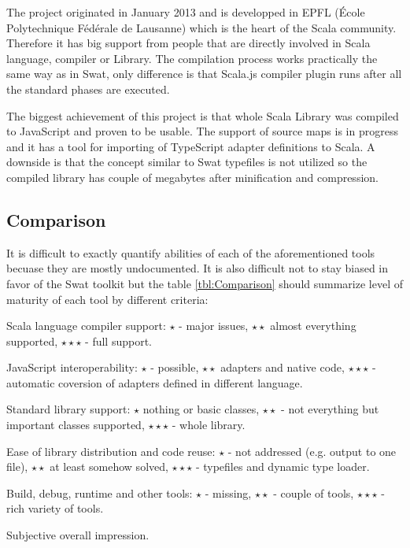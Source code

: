 \documentclass[12pt,a4paper]{report}
\begin{document}
The project originated in January 2013 and is developped in EPFL (École Polytechnique Fédérale de Lausanne) which is the heart of the Scala community. Therefore it has big support from people that are directly involved in Scala language, compiler or Library. The compilation process works practically the same way as in Swat, only difference is that Scala.js compiler plugin runs after all the standard phases are executed.

The biggest achievement of this project is that whole Scala Library was compiled to JavaScript and proven to be usable. The support of source maps is in progress and it has a tool for importing of TypeScript adapter definitions to Scala. A downside is that the concept similar to Swat typefiles is not utilized so the compiled library has couple of megabytes after minification and compression.

\subsection{Comparison}

It is difficult to exactly quantify abilities of each of the aforementioned tools becuase they are mostly undocumented. It is also difficult not to stay biased in favor of the Swat toolkit but the table \ref{tbl:Comparison} should summarize level of maturity of each tool by different criteria:

\begin{description}[style=multiline,leftmargin=5cm]
\item[Compiler] Scala language compiler support: $\star$ - major issues, $\star\star$ almost everything supported, $\star\star\star$ - full support.
\item[Interoperability] JavaScript interoperability: $\star$ - possible, $\star\star$ adapters and native code, $\star\star\star$ - automatic coversion of adapters defined in different language.
\item[Libraries] Standard library support: $\star$ nothing or basic classes, $\star\star$ - not everything but important classes supported, $\star\star\star$ - whole library.
\item[Distribution] Ease of library distribution and code reuse: $\star$ - not addressed (e.g. output to one file), $\star\star$ at least somehow solved, $\star\star\star$ - typefiles and dynamic type loader.
\item[Tooling] Build, debug, runtime and other tools: $\star$ - missing, $\star\star$ - couple of tools, $\star\star\star$ - rich variety of tools.
\item[Overall] Subjective overall impression.
\end{description}
\end{document}
